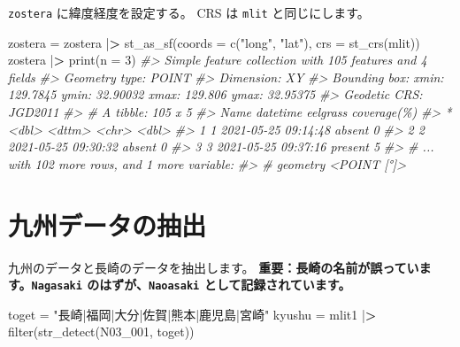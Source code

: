 \documentclass[
]{book}
\newenvironment{Shaded}{\begin{snugshade}}{\end{snugshade}}
\newcommand{\AttributeTok}[1]{\textcolor[rgb]{0.77,0.63,0.00}{#1}}
\newcommand{\CommentTok}[1]{\textcolor[rgb]{0.56,0.35,0.01}{\textit{#1}}}
\newcommand{\DecValTok}[1]{\textcolor[rgb]{0.00,0.00,0.81}{#1}}
\newcommand{\ErrorTok}[1]{\textcolor[rgb]{0.64,0.00,0.00}{\textbf{#1}}}
\newcommand{\FunctionTok}[1]{\textcolor[rgb]{0.00,0.00,0.00}{#1}}
\newcommand{\NormalTok}[1]{#1}
\newcommand{\OtherTok}[1]{\textcolor[rgb]{0.56,0.35,0.01}{#1}}
\newcommand{\SpecialCharTok}[1]{\textcolor[rgb]{0.00,0.00,0.00}{#1}}
\newcommand{\StringTok}[1]{\textcolor[rgb]{0.31,0.60,0.02}{#1}}
\theoremstyle{definition}
\theoremstyle{definition}
\theoremstyle{definition}
\theoremstyle{definition}
\theoremstyle{remark}
\begin{document}
\texttt{zostera} に緯度経度を設定する。
CRS は \texttt{mlit} と同じにします。

\begin{Shaded}
\begin{Highlighting}[]
\NormalTok{zostera }\OtherTok{=}\NormalTok{ zostera }\SpecialCharTok{|}\ErrorTok{\textgreater{}} \FunctionTok{st\_as\_sf}\NormalTok{(}\AttributeTok{coords =} \FunctionTok{c}\NormalTok{(}\StringTok{"long"}\NormalTok{, }\StringTok{"lat"}\NormalTok{), }\AttributeTok{crs =} \FunctionTok{st\_crs}\NormalTok{(mlit))}
\NormalTok{zostera }\SpecialCharTok{|}\ErrorTok{\textgreater{}} \FunctionTok{print}\NormalTok{(}\AttributeTok{n =} \DecValTok{3}\NormalTok{)}
\CommentTok{\#\textgreater{} Simple feature collection with 105 features and 4 fields}
\CommentTok{\#\textgreater{} Geometry type: POINT}
\CommentTok{\#\textgreater{} Dimension:     XY}
\CommentTok{\#\textgreater{} Bounding box:  xmin: 129.7845 ymin: 32.90032 xmax: 129.806 ymax: 32.95375}
\CommentTok{\#\textgreater{} Geodetic CRS:  JGD2011}
\CommentTok{\#\textgreater{} \# A tibble: 105 x 5}
\CommentTok{\#\textgreater{}    Name datetime            eelgrass \textasciigrave{}coverage(\%)\textasciigrave{}}
\CommentTok{\#\textgreater{} * \textless{}dbl\textgreater{} \textless{}dttm\textgreater{}              \textless{}chr\textgreater{}            \textless{}dbl\textgreater{}}
\CommentTok{\#\textgreater{} 1     1 2021{-}05{-}25 09:14:48 absent               0}
\CommentTok{\#\textgreater{} 2     2 2021{-}05{-}25 09:30:32 absent               0}
\CommentTok{\#\textgreater{} 3     3 2021{-}05{-}25 09:37:16 present              5}
\CommentTok{\#\textgreater{} \# ... with 102 more rows, and 1 more variable:}
\CommentTok{\#\textgreater{} \#   geometry \textless{}POINT [°]\textgreater{}}
\end{Highlighting}
\end{Shaded}

\hypertarget{ux4e5dux5ddeux30c7ux30fcux30bfux306eux62bdux51fa}{%
\section{九州データの抽出}\label{ux4e5dux5ddeux30c7ux30fcux30bfux306eux62bdux51fa}}

九州のデータと長崎のデータを抽出します。
\textbf{重要：長崎の名前が誤っています。\texttt{Nagasaki} のはずが、\texttt{Naoasaki} として記録されています。}

\begin{Shaded}
\begin{Highlighting}[]
\NormalTok{toget }\OtherTok{=} \StringTok{"長崎|福岡|大分|佐賀|熊本|鹿児島|宮崎"}
\NormalTok{kyushu }\OtherTok{=}\NormalTok{ mlit1 }\SpecialCharTok{|}\ErrorTok{\textgreater{}} \FunctionTok{filter}\NormalTok{(}\FunctionTok{str\_detect}\NormalTok{(N03\_001, toget))}
\end{Highlighting}
\end{Shaded}
\end{document}
